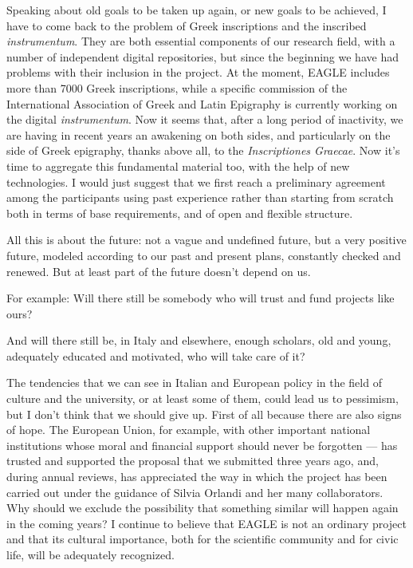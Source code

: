 Speaking about old goals to be taken up again, or new goals to be achieved, I have to come back to the problem of Greek inscriptions and the inscribed \emph{instrumentum}. They are both essential components of our research field, with a number of independent digital repositories, but since the beginning we have had problems with their inclusion in the project. At the moment, EAGLE includes more than 7000 Greek inscriptions, while a specific commission of the International Association of Greek and Latin Epigraphy is currently working on the digital \emph{instrumentum}. Now it seems that, after a long period of inactivity, we are having in recent years an awakening on both sides, and particularly on the side of Greek epigraphy, thanks above all, to the \emph{Inscriptiones Graecae}. Now it’s time to aggregate this fundamental material too, with the help of new technologies. I would just suggest that we first reach a preliminary agreement among the participants using past experience rather than starting from scratch both in terms of base requirements, and of open and flexible structure.

All this is about the future: not a vague and undefined future, but a very positive future, modeled according to our past and present plans, constantly checked and renewed. But at least part of the future doesn’t depend on us.

For example: Will there still be somebody who will trust and fund projects like ours?

And will there still be, in Italy and elsewhere, enough scholars, old and young, adequately educated and motivated, who will take care of it?

The tendencies that we can see in Italian and European policy in the field of culture and the university, or at least some of them, could lead us to pessimism, but I don’t think that we should give up. First of all because there are also signs of hope. The European Union, for example, with other important national institutions whose moral and financial support should never be forgotten --- has trusted and supported the proposal that we submitted three years ago, and, during annual reviews, has appreciated the way in which the project has been carried out under the guidance of Silvia Orlandi and her many collaborators. Why should we exclude the possibility that something similar will happen again in the coming years? I continue to believe that EAGLE is not an ordinary project and that its cultural importance, both for the scientific community and for civic life, will be adequately recognized.

